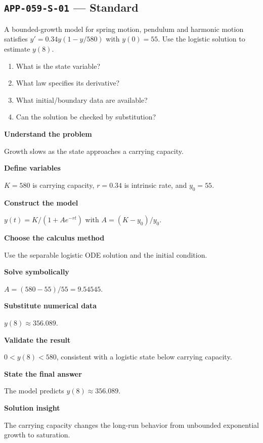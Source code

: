 \documentclass[11pt]{book}
\newcommand{\pid}[1]{\texttt{#1}}
\begin{document}
\subsection*{\pid{APP-059-S-01} — Standard}
\begin{problembox}
A bounded-growth model for spring motion, pendulum and harmonic motion satisfies $y'=0.34y(1-y/580)$ with $y(0)=55$. Use the logistic solution to estimate $y(8)$.
\end{problembox}
\begin{promptbox}\begin{enumerate}
\item What is the state variable?
\item What law specifies its derivative?
\item What initial/boundary data are available?
\item Can the solution be checked by substitution?
\end{enumerate}\end{promptbox}
\begin{solutionbox}
\textbf{Understand the problem}\par Growth slows as the state approaches a carrying capacity.\par\medskip
\textbf{Define variables}\par $K=580$ is carrying capacity, $r=0.34$ is intrinsic rate, and $y_0=55$.\par\medskip
\textbf{Construct the model}\par $y(t)=K/(1+A e^{-rt})$ with $A=(K-y_0)/y_0$.\par\medskip
\textbf{Choose the calculus method}\par Use the separable logistic ODE solution and the initial condition.\par\medskip
\textbf{Solve symbolically}\par $A=(580-55)/55=9.54545$.\par\medskip
\textbf{Substitute numerical data}\par $y(8)\approx 356.089$.\par\medskip
\textbf{Validate the result}\par $0<y(8)<580$, consistent with a logistic state below carrying capacity.\par\medskip
\textbf{State the final answer}\par The model predicts $y(8)\approx 356.089$.\par\medskip
\textbf{Solution insight}\par The carrying capacity changes the long-run behavior from unbounded exponential growth to saturation.\par\medskip
\end{solutionbox}
\end{document}
